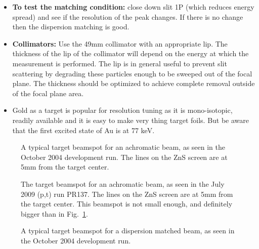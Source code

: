 \documentclass[11pt]{report}
\begin{document}
\begin{itemize}
\item {\bf To test the matching condition:} close down slit 1P (which reduces energy spread)
      and see if the resolution of the peak changes. If there is no change
      then the dispersion matching is good.
\item {\bf Collimators:} Use the 49mm collimator with an appropriate lip. 
      The thickness of the lip of
      the collimator will depend on the energy at which the measurement is performed.
      The lip is in general useful to prevent slit scattering by degrading these particles
      enough to be sweeped out of the focal plane. The thickness should 
      be optimized to achieve complete removal outside of the focal plane area.

\item Gold as a target is popular for resolution tuning as it is mono-isotopic, readily available
      and it is easy to make very thing target foils.
      But be aware that the first excited state of Au is at 77 keV.
      

\end{itemize}

\begin{figure}[!ht]
\centerline{\vspace{0cm}\hspace{0cm}
}
\centering
\caption{A typical target beamspot for an achromatic beam, as seen in the October 2004 development run.
The lines on the ZnS screen are at 5mm from the target center.}
\label{fig:beamspot-ach-beam-1}
\end{figure} 

\begin{figure}[!ht]
\centerline{\vspace{0cm}\hspace{0cm}
}
\centering
\caption{The target beamspot for an achromatic beam, as seen in the July 2009 (p,t) run PR137. 
The lines on the ZnS screen are at 5mm from the target center.
This beamspot is not small enough, and definitely bigger than in Fig.~\ref{fig:beamspot-ach-beam-1}.}
\label{fig:beamspot-ach-beam-2}
\end{figure} 


\begin{figure}[!ht]
\centerline{\vspace{0cm}\hspace{0cm}
}
\centering
\caption{A typical target beamspot for a dispersion matched beam, as seen in the October 2004 development run.}
\label{fig:beamspot-dm-beam}
\end{figure} 
\end{document}
